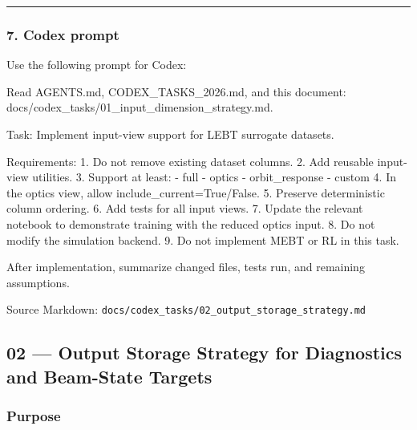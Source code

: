 \documentclass[
]{article}
\newenvironment{Shaded}{}{}
\newcommand{\NormalTok}[1]{#1}
\begin{document}
\begin{center}\rule{0.5\linewidth}{0.5pt}\end{center}

\hypertarget{codex-prompt}{%
\subsubsection{7. Codex prompt}\label{codex-prompt}}

Use the following prompt for Codex:

\begin{Shaded}
\begin{Highlighting}[]
\NormalTok{Read AGENTS.md, CODEX\_TASKS\_2026.md, and this document:}
\NormalTok{docs/codex\_tasks/01\_input\_dimension\_strategy.md.}

\NormalTok{Task:}
\NormalTok{Implement input{-}view support for LEBT surrogate datasets.}

\NormalTok{Requirements:}
\NormalTok{1. Do not remove existing dataset columns.}
\NormalTok{2. Add reusable input{-}view utilities.}
\NormalTok{3. Support at least:}
\NormalTok{   {-} full}
\NormalTok{   {-} optics}
\NormalTok{   {-} orbit\_response}
\NormalTok{   {-} custom}
\NormalTok{4. In the optics view, allow \textasciigrave{}include\_current=True/False\textasciigrave{}.}
\NormalTok{5. Preserve deterministic column ordering.}
\NormalTok{6. Add tests for all input views.}
\NormalTok{7. Update the relevant notebook to demonstrate training with the reduced optics input.}
\NormalTok{8. Do not modify the simulation backend.}
\NormalTok{9. Do not implement MEBT or RL in this task.}

\NormalTok{After implementation, summarize changed files, tests run, and remaining assumptions.}
\end{Highlighting}
\end{Shaded}

Source Markdown:
\texttt{docs/codex\_tasks/02\_output\_storage\_strategy.md}

\hypertarget{output-storage-strategy-for-diagnostics-and-beam-state-targets}{%
\subsection{02 --- Output Storage Strategy for Diagnostics and
Beam-State
Targets}\label{output-storage-strategy-for-diagnostics-and-beam-state-targets}}

\hypertarget{purpose-2}{%
\subsubsection{Purpose}\label{purpose-2}}
\end{document}

